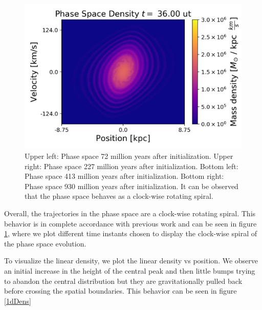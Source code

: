\begin{figure}[h!]
    \includegraphics[scale=0.45]{imag/phase90.png}
    \caption{Upper left: Phase space 72 million years after initialization. Upper right: Phase space 227 million years after initialization. Bottom left: Phase space 413 million years after initialization. Bottom right: Phase space 930 million years after initialization. It can be observed that the phase space behaves as a clock-wise rotating spiral.}
    \label{1dphase}
\end{figure}


Overall, the trajectories in the phase space are a clock-wise rotating spiral. This behavior is in complete accordance with previous work and can be seen in figure \ref{1dphase}, where we plot different time instants chosen to display the clock-wise spiral of the phase space evolution.

To visualize the linear density, we plot the linear density vs position. We observe an initial increase in the height of the central peak and then little bumps trying to abandon the central distribution but they are gravitationally pulled back before crossing the spatial boundaries. This behavior can be seen in figure \ref{1dDens}




